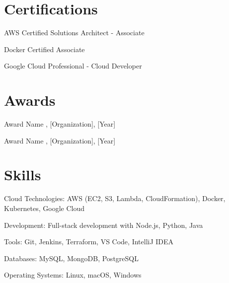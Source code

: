     \section{Certifications}

    \begin{onecolentry}
        \begin{highlights}
            \item AWS Certified Solutions Architect - Associate
            \item Docker Certified Associate
            \item Google Cloud Professional - Cloud Developer
        \end{highlights}
    \end{onecolentry}

    \section{Awards}

    \begin{onecolentry}
        \begin{highlights}
            \item [Award Name], [Organization], [Year]
            \item [Award Name], [Organization], [Year]
        \end{highlights}
    \end{onecolentry}

    \section{Skills}

    \begin{onecolentry}
        \begin{highlights}
            \item Cloud Technologies: AWS (EC2, S3, Lambda, CloudFormation), Docker, Kubernetes, Google Cloud
            \item Development: Full-stack development with Node.js, Python, Java
            \item Tools: Git, Jenkins, Terraform, VS Code, IntelliJ IDEA
            \item Databases: MySQL, MongoDB, PostgreSQL
            \item Operating Systems: Linux, macOS, Windows
        \end{highlights}
    \end{onecolentry}

